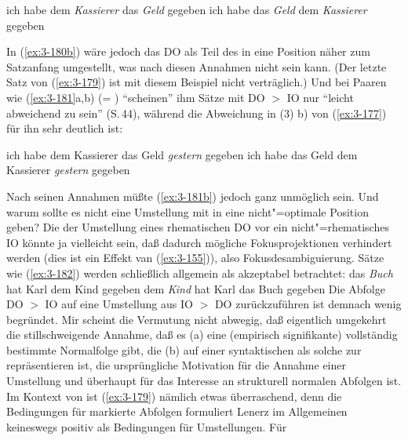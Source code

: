 \documentclass[output=paper]{langsci/langscibook}
\begin{document}
\begin{exe}
\ex
\label{ex:3-180}
\begin{xlist}
\ex
\label{ex:3-180a}
ich habe dem \textit{Kassierer} das \textit{Geld} gegeben
\ex
\label{ex:3-180b}
ich habe das \textit{Geld} dem \textit{Kassierer} gegeben
\end{xlist}
\end{exe}
In (\ref{ex:3-180b}) wäre jedoch das DO als Teil des  in eine
 Position näher zum Satzanfang umgestellt, was
nach diesen Annahmen nicht sein kann. (Der letzte Satz von (\ref{ex:3-179}) ist
mit diesem Beispiel nicht verträglich.) Und bei Paaren wie (\ref{ex:3-181}a,b) (= \citealt[44 (6e,f)]{Lenerz77})
"`scheinen"' ihm Sätze mit DO $>$ IO nur "`leicht abweichend zu sein"'
(S.\,44), während die Abweichung in (3) b) von (\ref{ex:3-177}) für ihn sehr
deutlich ist:
\begin{exe}
\ex
\label{ex:3-181}
\begin{xlist}
\ex
\label{ex:3-181a}
ich habe dem Kassierer das Geld \textit{gestern} gegeben
\ex
\label{ex:3-181b}
ich habe das Geld dem Kassierer \textit{gestern} gegeben
\end{xlist}
\end{exe}
Nach seinen Annahmen müßte (\ref{ex:3-181b}) jedoch ganz unmöglich sein. Und
warum sollte es nicht eine Umstellung mit  in eine nicht"=optimale Position geben? Die  der Umstellung eines rhematischen DO vor ein nicht"=rhematisches IO könnte ja vielleicht sein, daß dadurch mögliche Fokusprojektionen verhindert werden (dies ist ein Effekt van (\ref{ex:3-155})), also Fokusdesambiguierung. Sätze wie (\ref{ex:3-182}) werden schließlich allgemein als akzeptabel betrachtet:
\eal
\label{ex:3-182}
\ex
\label{ex:3-182a}
das \textit{Buch} hat Karl dem Kind gegeben
\ex
\label{ex:3-182b}
dem \textit{Kind} hat Karl das Buch gegeben
\zl
Die Abfolge DO $>$ IO auf eine Umstellung aus IO $>$ DO zurückzuführen ist
demnach wenig begründet. Mir scheint die Vermutung nicht abwegig, daß
eigentlich umgekehrt die stillschweigende Annahme, daß es (a) eine
(empirisch signifikante) vollständig bestimmte Normalfolge gibt, die
(b) auf einer syntaktischen  als solche zur
repräsentieren ist, die ursprüngliche Motivation für die Annahme einer
Umstellung und überhaupt für das Interesse an strukturell normalen
Abfolgen ist. Im Kontext von \citet{Lenerz77} ist (\ref{ex:3-179}) nämlich etwas
überraschend, denn die Bedingungen für markierte Abfolgen formuliert
Lenerz im Allgemeinen keineswegs positiv als Bedingungen für Umstellungen. Für
\end{document}
